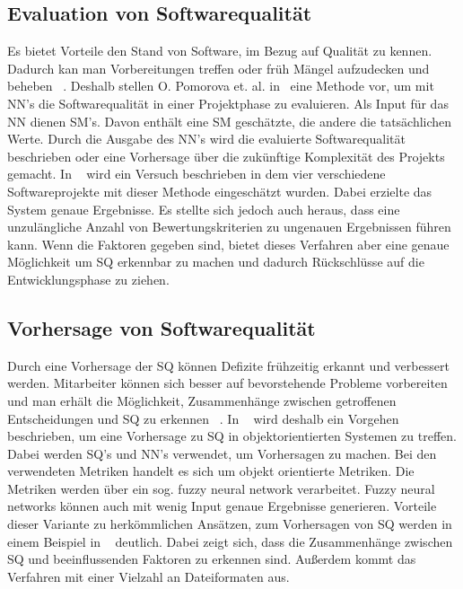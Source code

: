 \subsection{Evaluation von Softwarequalität}
Es bietet Vorteile den Stand von Software, im Bezug auf Qualität zu kennen. Dadurch kan man Vorbereitungen treffen oder früh Mängel aufzudecken und beheben ~\cite{Pomorova2013}. Deshalb stellen O. Pomorova et. al. in~\cite{Pomorova2013} eine Methode vor, um mit NN's die Softwarequalität in einer Projektphase zu evaluieren. Als Input für das NN dienen SM's. Davon enthält eine SM geschätzte, die andere die tatsächlichen Werte.
Durch die Ausgabe des NN's wird die evaluierte Softwarequalität beschrieben oder eine Vorhersage über die zukünftige Komplexität des Projekts gemacht. 
In ~\cite{Pomorova2013} wird ein Versuch beschrieben in dem vier verschiedene Softwareprojekte mit dieser Methode eingeschätzt wurden. Dabei erzielte das System genaue Ergebnisse. Es stellte sich jedoch auch heraus, dass eine unzulängliche Anzahl von Bewertungskriterien zu ungenauen Ergebnissen führen kann.
Wenn die Faktoren gegeben sind, bietet dieses Verfahren aber eine genaue Möglichkeit um SQ erkennbar zu machen und dadurch Rückschlüsse auf die Entwicklungsphase zu ziehen.

\subsection{Vorhersage von Softwarequalität}
Durch eine Vorhersage der SQ können Defizite frühzeitig erkannt und verbessert werden. Mitarbeiter können sich besser auf bevorstehende Probleme vorbereiten und man erhält die Möglichkeit, Zusammenhänge zwischen getroffenen Entscheidungen und SQ zu erkennen ~\cite{Peng2009}. In ~\cite{Peng2009} wird deshalb ein Vorgehen beschrieben, um eine Vorhersage zu SQ in objektorientierten Systemen zu treffen. Dabei werden SQ's und NN's verwendet, um Vorhersagen zu machen. Bei den verwendeten Metriken handelt es sich um objekt orientierte Metriken. Die Metriken werden über ein sog. fuzzy neural network verarbeitet. Fuzzy neural networks können auch mit wenig Input genaue Ergebnisse generieren.
Vorteile dieser Variante zu herkömmlichen Ansätzen, zum Vorhersagen von SQ werden in einem Beispiel in ~\cite{Peng2009} deutlich. Dabei zeigt sich, dass die Zusammenhänge zwischen SQ und beeinflussenden Faktoren zu erkennen sind. Außerdem kommt das Verfahren mit einer Vielzahl an Dateiformaten aus.

